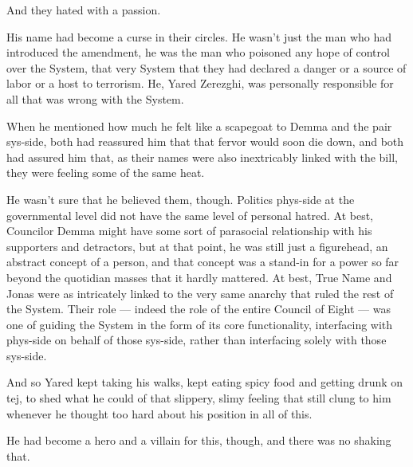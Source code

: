 And they hated with a passion.

His name had become a curse in their circles. He wasn't just the man who had introduced the amendment, he was the man who poisoned any hope of control over the System, that very System that they had declared a danger or a source of labor or a host to terrorism. He, Yared Zerezghi, was personally responsible for all that was wrong with the System.

When he mentioned how much he felt like a scapegoat to Demma and the pair sys-side, both had reassured him that that fervor would soon die down, and both had assured him that, as their names were also inextricably linked with the bill, they were feeling some of the same heat.

He wasn't sure that he believed them, though. Politics phys-side at the governmental level did not have the same level of personal hatred. At best, Councilor Demma might have some sort of parasocial relationship with his supporters and detractors, but at that point, he was still just a figurehead, an abstract concept of a person, and that concept was a stand-in for a power so far beyond the quotidian masses that it hardly mattered. At best, True Name and Jonas were as intricately linked to the very same anarchy that ruled the rest of the System. Their role — indeed the role of the entire Council of Eight — was one of guiding the System in the form of its core functionality, interfacing with phys-side on behalf of those sys-side, rather than interfacing solely with those sys-side.

And so Yared kept taking his walks, kept eating spicy food and getting drunk on tej, to shed what he could of that slippery, slimy feeling that still clung to him whenever he thought too hard about his position in all of this.

He had become a hero and a villain for this, though, and there was no shaking that.

